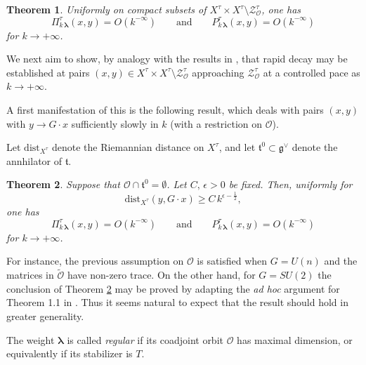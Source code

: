 \documentclass[12pt,a4paper]{article}
\theoremstyle{plain}
\newtheorem{thm}{Theorem}[section]
\theoremstyle{definition}
\begin{document}
\begin{thm}
\label{thm:rapid decay compact}
Uniformly on compact subsets of
$X^\tau\times X^\tau\setminus \mathcal{Z}^\tau_{\mathcal{O}}$,
one has
$$
\Pi^\tau_{k\,\boldsymbol{\lambda}}(x,y)=
O\left(k^{-\infty}\right)\qquad
\text{and}\qquad P^\tau_{k\,\boldsymbol{\lambda}}(x,y)=
O\left(k^{-\infty}\right)
$$
for $k\rightarrow +\infty$.

\end{thm}


We next aim to show, by analogy with the results in \cite{p22},
that rapid decay
may be established at pairs 
$(x,y)\in X^\tau\times X^\tau\setminus \mathcal{Z}^\tau_{\mathcal{O}}$
approaching $\mathcal{Z}^\tau_{\mathcal{O}}$ at a controlled pace as $k\rightarrow +\infty$.

A first manifestation of this is the following result,
which deals with pairs $(x,y)$ with $y\rightarrow G\cdot x$
sufficiently slowly in $k$ (with a restriction on
$\mathcal{O}$). 

Let $\mathrm{dist}_{X^\tau}$ denote the Riemannian distance 
on $X^\tau$, and let $\mathfrak{t}^0\subset\mathfrak{g}^\vee$ denote the annhilator
of $\mathfrak{t}$.

\begin{thm}
\label{thm:rapid decay orbit}
Suppose that $\mathcal{O}\cap \mathfrak{t}^0=\emptyset$.
Let $C,\,\epsilon>0$ be fixed. 
Then, uniformly for 
\begin{equation}
\label{eqn:bd distance orbits}
\mathrm{dist}_{X^\tau}(y,G\cdot x)\ge C\,k^{\epsilon-\frac{1}{2}},
\end{equation}
one has
$$
\Pi^\tau_{k\,\boldsymbol{\lambda}}(x,y)=
O\left(k^{-\infty}\right)\qquad
\text{and}\qquad P^\tau_{k\,\boldsymbol{\lambda}}(x,y)=
O\left(k^{-\infty}\right)
$$
for $k\rightarrow +\infty$.
\end{thm}

For instance, the previous assumption on $\mathcal{O}$ is satisfied when
$G=U(n)$ and the matrices in $\tilde{\mathcal{O}}$ have non-zero trace.
On the other hand, for $G=SU(2)$
the conclusion of Theorem \ref{thm:rapid decay orbit} may 
be proved by adapting the \textit{ad hoc}
argument for
Theorem 1.1 in \cite{gp20}.
Thus it seems natural to expect that the result should hold in
greater generality.





The weight $\boldsymbol{\lambda}$ is called 
\textit{regular} if its coadjoint orbit $\mathcal{O}$ has
maximal dimension, or equivalently if its
stabilizer is $T$.
\end{document}
